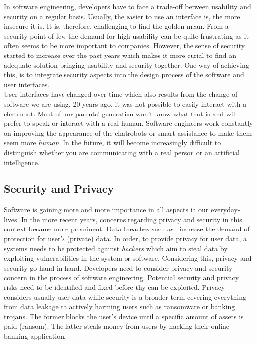 \documentclass[11pt,a4paper]{article}
\begin{document}
In software engineering, developers have to face a trade-off between usability and security on a regular basis. Usually, the easier to use an interface is, the more insecure it is. It is, therefore, challenging to find the golden mean. From a security point of few the demand for high usability can be quite frustrating as it often seems to be more important to companies. However, the sense of security started to increase over the past years which makes it more curial to find an adequate solution bringing usability and security together. One way of achieving this, is to integrate security aspects into the design process of the software and user interfaces.\\

User interfaces have changed over time which also results from the change of software we are using. 20 years ago, it was not possible to easily interact with a chatrobot. Most of our parents' generation won't know what that is and will prefer to speak or interact with a real human. Software engineers work constantly on improving the appearance of the chatrobots or smart assistance to make them seem more \textit{human}. In the future, it will become increasingly difficult to distinguish whether you are communicating with a real person or an artificial intelligence.

\subsection{Security and Privacy\label{sec:securityprivacy}}
Software is gaining more and more importance in all aspects in our everyday-lives. In the more recent years, concerns regarding privacy and security in this context became more prominent. Data breaches such as~\cite{facebook} increase the demand of protection for user's (private) data. In order, to provide privacy for user data, a systems needs to be protected against \textit{hackers} which aim to steal data by exploiting vulnerabilities in the system or software. Considering this, privacy and security go hand in hand. Developers need to consider privacy and security concern in the process of software engineering. Potential security and privacy risks need to be identified and fixed before thy can be exploited. Privacy considers usually user data while security is a broader term covering everything from data leakage to actively harming users such as ransomware or banking trojans. The former blocks the user's device until a specific amount of assets is paid (ransom). The latter steals money from users by hacking their online banking application.\\
\end{document}
